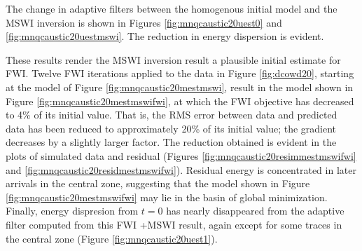 The change in adaptive filters between the homogenous initial model
and the MSWI inversion is shown in Figures
\ref{fig:mnqcaustic20uest0} and \ref{fig:mnqcaustic20uestmswi}. The
reduction in energy dispersion is evident.


These results render the MSWI inversion result a plausible initial
estimate for FWI. Twelve FWI iterations applied to the data in Figure \ref{fig:dcowd20}, starting at the model of
Figure \ref{fig:mnqcaustic20mestmswi}, result in the
model shown in Figure \ref{fig:mnqcaustic20mestmswifwi}, at which the
FWI objective has decreased to 4\% of its initial value. That is, the
RMS error between data and predicted data has been reduced to
approximately 20\% of its initial value; the gradient
decreases by a slightly larger factor. The reduction obtained is evident in the plots of simulated data and
residual (Figures \ref{fig:mnqcaustic20resimmestmswifwi} and
\ref{fig:mnqcaustic20residmestmswifwi}). Residual energy is
concentrated in later arrivals in the
central zone, suggesting that the model shown in Figure
\ref{fig:mnqcaustic20mestmswifwi} may lie in the basin of global minimization. Finally, energy dispresion
from $t=0$ has nearly disappeared from the adaptive filter computed
from this FWI +MSWI result, again except for some traces in the
central zone (Figure \ref{fig:mnqcaustic20uest1}).




